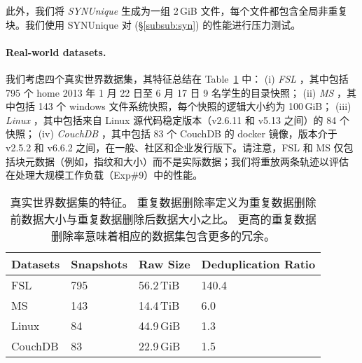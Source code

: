 此外，我们将 {\em SYNUnique} 生成为一组 2\,GiB 文件，每个文件都包含全局非重复块。我们使用 SYNUnique 对 \prototype (\S\ref{subsub:syn}) 的性能进行压力测试。

\paragraph{Real-world datasets.} 我们考虑四个真实世界数据集，其特征总结在 Table~\ref{tab:datasets} 中： (i) {\em FSL} \cite{fsl}，其中包括 795 个 home 2013 年 1 月 22 日至 6 月 17 日 9 名学生的目录快照； (ii) {\em MS} \cite{meyer11}，其中包括 143 个 windows 文件系统快照，每个快照的逻辑大小约为 100\,GiB； (iii) {\em Linux} \cite{linux}，其中包括来自 Linux 源代码稳定版本（v2.6.11 和 v5.13 之间）的 84 个快照； (iv) {\em CouchDB} \cite{couchdb}，其中包括 83 个 CouchDB 的 docker 镜像，版本介于 v2.5.2 和 v6.6.2 之间，在一般、社区和企业发行版下。请注意，FSL 和 MS 仅包括块元数据（例如，指纹和大小）而不是实际数据；我们将重放两条轨迹以评估 \prototype 在处理大规模工作负载（Exp\#9）中的性能。

\begin{table}
  \centering
  \small
  \begin{tabular}{|l|l|l|l|}
    \hline
    {\bf Datasets} & {\bf Snapshots} & {\bf Raw Size} & {\bf Deduplication Ratio} \\
    \hline
    \hline
    FSL & 795 & 56.2\,TiB & 140.4 \\
    \hline
    MS & 143 & 14.4\,TiB & 6.0 \\
    \hline
    Linux & 84 & 44.9\,GiB & 1.3 \\
    \hline
    CouchDB & 83 & 22.9\,GiB & 1.5 \\
    \hline
  \end{tabular}
  \caption{真实世界数据集的特征。 重复数据删除率定义为重复数据删除前数据大小与重复数据删除后数据大小之比。 更高的重复数据删除率意味着相应的数据集包含更多的冗余。}
  \vspace{-6pt}
  \label{tab:datasets}
\end{table}
